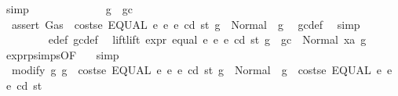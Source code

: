\begin{isabellebody}
\ simp\isanewline
\ \ \ \ \isamarkupfalse%
\isanewline
\ \ \ \ \ \ \isamarkupfalse%
\ {\isachardoublequoteopen}{\isasymnot}\ g\ {\isasymle}\ gc{\isachardoublequoteclose}\isanewline
\ \ \ \ \ \ \isamarkupfalse%
\ \isamarkupfalse%
\ {\isacharasterisk}{\kern0pt}{\isacharcolon}{\kern0pt}\ {\isachardoublequoteopen}assert\ Gas\ {\isacharparenleft}{\kern0pt}{\isacharparenleft}{\kern0pt}{\isacharless}{\kern0pt}{\isacharparenright}{\kern0pt}\ {\isacharparenleft}{\kern0pt}costs\isactrlsub e\ {\isacharparenleft}{\kern0pt}EQUAL\ e{}\ e{}{\isacharparenright}{\kern0pt}\ e\ cd\ st{\isacharparenright}{\kern0pt}{\isacharparenright}{\kern0pt}\ g\ {\isacharequal}{\kern0pt}\ Normal\ {\isacharparenleft}{\kern0pt}{\isacharparenleft}{\kern0pt}{\isacharparenright}{\kern0pt}{\isacharcomma}{\kern0pt}\ g{\isacharparenright}{\kern0pt}{\isachardoublequoteclose}\ \isamarkupfalse%
\ gc{\isacharunderscore}{\kern0pt}def\ \isamarkupfalse%
\ simp\isanewline
\ \ \ \ \ \ \isamarkupfalse%
\ {}{}{\isacharparenleft}{\kern0pt}{}{\isacharparenright}{\kern0pt}\ e{\isacharunderscore}{\kern0pt}def\ gc{\isacharunderscore}{\kern0pt}def\ \isamarkupfalse%
\ lift{\isacharcolon}{\kern0pt}{\isachardoublequoteopen}lift\ expr\ equal\ e{}\ e{}\ e\ cd\ st\ {\isacharparenleft}{\kern0pt}g\ {\isacharminus}{\kern0pt}\ gc{\isacharparenright}{\kern0pt}\ {\isacharequal}{\kern0pt}\ Normal\ {\isacharparenleft}{\kern0pt}xa{\isacharcomma}{\kern0pt}\ g{}{\isacharparenright}{\kern0pt}{\isachardoublequoteclose}\ \isamarkupfalse%
\ expr{\isachardot}{\kern0pt}psimps{\isacharparenleft}{\kern0pt}{}{}{\isacharparenright}{\kern0pt}{\isacharbrackleft}{\kern0pt}OF\ {}{}{\isacharparenleft}{\kern0pt}{}{\isacharparenright}{\kern0pt}{\isacharbrackright}{\kern0pt}\ \isamarkupfalse%
\ simp\isanewline
\ \ \ \ \ \ \isamarkupfalse%
\ \isamarkupfalse%
\ {\isacharasterisk}{\kern0pt}{\isacharasterisk}{\kern0pt}{\isacharcolon}{\kern0pt}\ {\isachardoublequoteopen}modify\ {\isacharparenleft}{\kern0pt}{\isasymlambda}g{\isachardot}{\kern0pt}\ g\ {\isacharminus}{\kern0pt}\ costs\isactrlsub e\ {\isacharparenleft}{\kern0pt}EQUAL\ e{}\ e{}{\isacharparenright}{\kern0pt}\ e\ cd\ st{\isacharparenright}{\kern0pt}\ g\ {\isacharequal}{\kern0pt}\ Normal\ {\isacharparenleft}{\kern0pt}{\isacharparenleft}{\kern0pt}{\isacharparenright}{\kern0pt}{\isacharcomma}{\kern0pt}\ g\ {\isacharminus}{\kern0pt}\ costs\isactrlsub e\ {\isacharparenleft}{\kern0pt}EQUAL\ e{}\ e{}{\isacharparenright}{\kern0pt}\ e\ cd\ st{\isacharparenright}{\kern0pt}{\isachardoublequoteclose}\ \isamarkupfalse%

\end{isabellebody}
